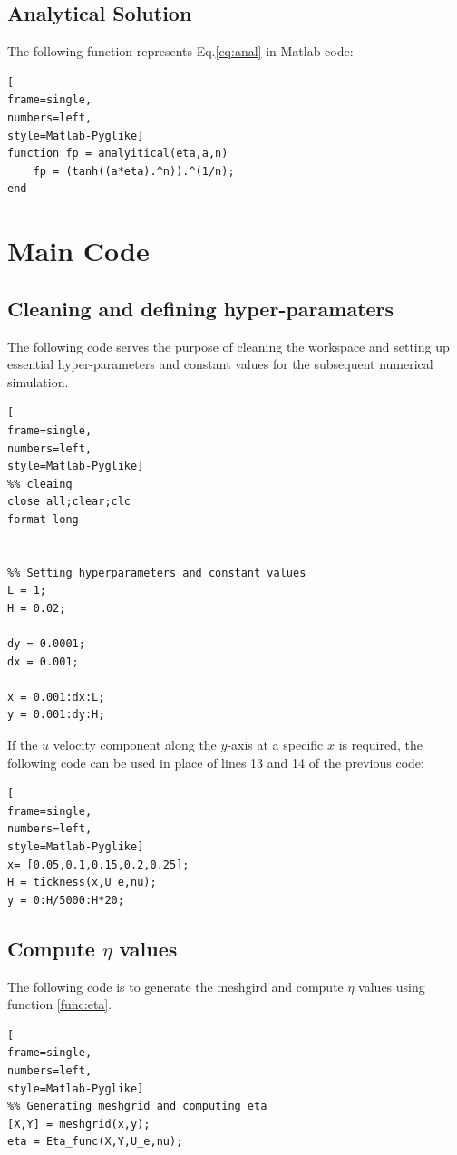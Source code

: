 \documentclass[]{report}
\begin{document}
\subsection{Analytical Solution}
\label{func:anal}
The following function represents Eq.\ref{eq:anal} in Matlab code:
\begin{lstlisting}[
frame=single,
numbers=left,
style=Matlab-Pyglike]
function fp = analyitical(eta,a,n)
    fp = (tanh((a*eta).^n)).^(1/n);
end
\end{lstlisting}

\section{Main Code}
\subsection{Cleaning and defining hyper-paramaters}

The following code serves the purpose of cleaning the workspace and setting up essential hyper-parameters and constant values for the subsequent numerical simulation.

\begin{lstlisting}[
frame=single,
numbers=left,
style=Matlab-Pyglike]
%% cleaing 
close all;clear;clc
format long


%% Setting hyperparameters and constant values
L = 1;
H = 0.02;

dy = 0.0001;
dx = 0.001;

x = 0.001:dx:L;
y = 0.001:dy:H;
\end{lstlisting}

If the $u$ velocity component along the $y$-axis at a specific $x$ is required, the following code can be used in place of lines 13 and 14 of the previous code:

\begin{lstlisting}[
frame=single,
numbers=left,
style=Matlab-Pyglike]
x= [0.05,0.1,0.15,0.2,0.25];
H = tickness(x,U_e,nu);
y = 0:H/5000:H*20;
\end{lstlisting}
\subsection{Compute $\eta$ values}
The following code is to generate the meshgird and compute $\eta$ values using function \ref{func:eta}. 
\begin{lstlisting}[
frame=single,
numbers=left,
style=Matlab-Pyglike]
%% Generating meshgrid and computing eta
[X,Y] = meshgrid(x,y);
eta = Eta_func(X,Y,U_e,nu);
\end{lstlisting}
\end{document}

